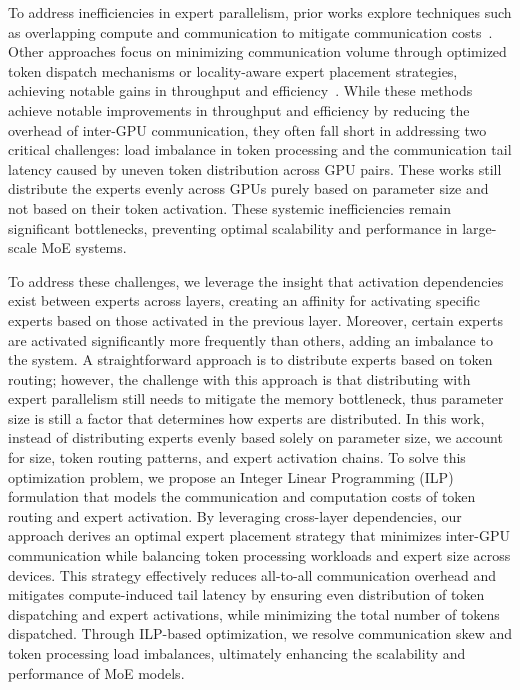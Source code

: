To address inefficiencies in expert parallelism, prior works explore techniques such as overlapping compute and communication to mitigate communication costs~\cite{deepspeed-moe, megatron, li2023accelerating, fastermoe,cai2024shortcut,singh2023hybrid,jiang2024lancet}.
%
Other approaches focus on minimizing communication volume through optimized token dispatch mechanisms or locality-aware expert placement strategies, achieving notable gains in throughput and efficiency~\cite{exflow}. 
%
While these methods achieve notable improvements in throughput and efficiency by reducing the overhead of inter-GPU communication, they often fall short in addressing two critical challenges: load imbalance in token processing and the communication tail latency caused by uneven token distribution across GPU pairs. 
%
These works still distribute the experts evenly across GPUs purely based on parameter size and not based on their token activation. 
%
These systemic inefficiencies remain significant bottlenecks, preventing optimal scalability and performance in large-scale MoE systems.

To address these challenges, we leverage the insight that activation dependencies exist between experts across layers, creating an affinity for activating specific experts based on those activated in the previous layer.
% 
Moreover, certain experts are activated significantly more frequently than others, adding an imbalance to the system.
%
A straightforward approach is to distribute experts based on token routing; however, the challenge with this approach is that distributing with expert parallelism still needs to mitigate the memory bottleneck, thus parameter size is still a factor that determines how experts are distributed.
%
In this work, instead of distributing experts evenly based solely on parameter size, we account for size, token routing patterns, and expert activation chains.
%
To solve this optimization problem, we propose an Integer Linear Programming (ILP) formulation that models the communication and computation costs of token routing and expert activation.
%
By leveraging cross-layer dependencies, our approach derives an optimal expert placement strategy that minimizes inter-GPU communication while balancing token processing workloads and expert size across devices.
% 
This strategy effectively reduces all-to-all communication overhead and mitigates compute-induced tail latency by ensuring even distribution of token dispatching and expert activations, while minimizing the total number of tokens dispatched.
% 
Through ILP-based optimization, we resolve communication skew and token processing load imbalances, ultimately enhancing the scalability and performance of MoE models.

